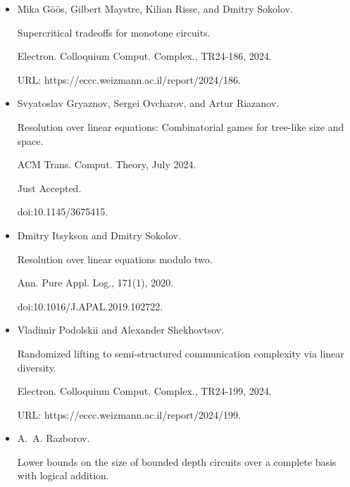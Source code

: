 \documentclass[10pt,a4paper]{article}
\begin{document}
\begin{itemize}
doi:10.1109/SFCS.1981.35.





\item 
[17]

Mika Göös, Gilbert Maystre, Kilian Risse, and Dmitry Sokolov.


Supercritical tradeoffs for monotone circuits.


Electron. Colloquium Comput. Complex., TR24-186, 2024.


URL: https://eccc.weizmann.ac.il/report/2024/186.





\item 
[18]

Svyatoslav Gryaznov, Sergei Ovcharov, and Artur Riazanov.


Resolution over linear equations: Combinatorial games for tree-like
size and space.


ACM Trans. Comput. Theory, July 2024.


Just Accepted.


doi:10.1145/3675415.





\item 
[19]

Dmitry Itsykson and Dmitry Sokolov.


Resolution over linear equations modulo two.


Ann. Pure Appl. Log., 171(1), 2020.


doi:10.1016/J.APAL.2019.102722.





\item 
[20]

Vladimir Podolskii and Alexander Shekhovtsov.


Randomized lifting to semi-structured communication complexity via
linear diversity.


Electron. Colloquium Comput. Complex., TR24-199, 2024.


URL: https://eccc.weizmann.ac.il/report/2024/199.





\item 
[21]

A. A. Razborov.


Lower bounds on the size of bounded depth circuits over a complete
basis with logical addition.



\end{itemize}
\end{document}
